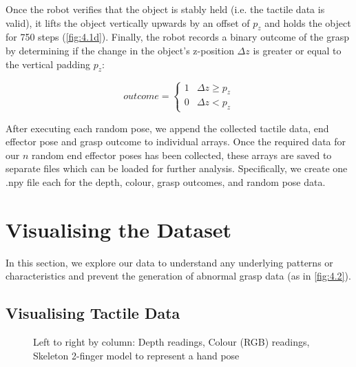 \documentclass[11pt, a4paper]{report}
\begin{document}
Once the robot verifies that the object is stably held (i.e. the tactile data is valid), it lifts the object vertically upwards by an offset of $p_z$ and holds the object for 750 steps (\ref{fig:4.1d}). Finally, the robot records a binary outcome of the grasp by determining if the change in the object's z-position $\Delta z$ is greater or equal to the vertical padding $p_z$:

\begin{equation}
    outcome=\begin{cases}1 & \Delta z\geq p_z \\ 0 & \Delta z<p_z\end{cases}
\end{equation}

After executing each random pose, we append the collected tactile data, end effector pose and grasp outcome to individual arrays. Once the required data for our $n$ random end effector poses has been collected, these arrays are saved to separate files which can be loaded for further analysis. Specifically, we create one .npy file each for the depth, colour, grasp outcomes, and random pose data.


\newpage
\section{Visualising the Dataset}
\label{sec:4.3}
In this section, we explore our data to understand any underlying patterns or characteristics and prevent the generation of abnormal grasp data (as in \ref{fig:4.2}).


\subsection{Visualising Tactile Data}
\label{sec:4.3.1}

\begin{figure}[H]%
    \centering
    \qquad
    \caption{Left to right by column: Depth readings, Colour (RGB) readings, Skeleton 2-finger model to represent a hand pose}
    \label{fig:4.3}%
\end{figure}
\end{document}
